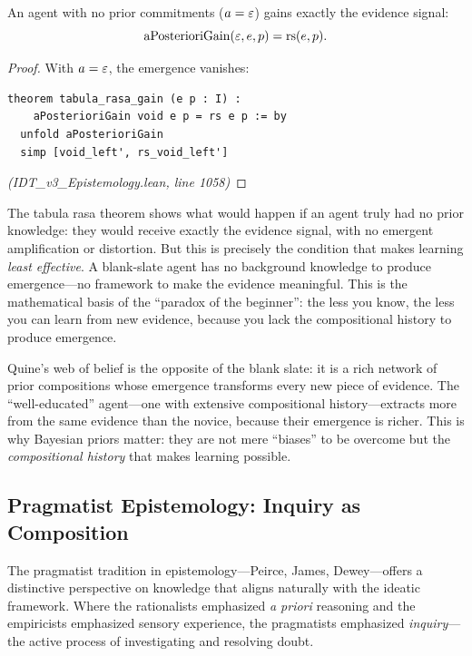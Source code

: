 \begin{theorem}
\label{thm:tabula-rasa}
An agent with no prior commitments ($a = \varepsilon$) gains exactly the evidence signal:
\[
  \mathrm{aPosterioriGain}(\varepsilon, e, p) = \mathrm{rs}(e, p).
\]
\end{theorem}

\begin{proof}
With $a = \varepsilon$, the emergence vanishes:
\begin{lstlisting}
theorem tabula_rasa_gain (e p : I) :
    aPosterioriGain void e p = rs e p := by
  unfold aPosterioriGain
  simp [void_left', rs_void_left']
\end{lstlisting}
\textit{(IDT\_v3\_Epistemology.lean, line 1058)}
\end{proof}

\begin{interpretation}
The tabula rasa theorem shows what would happen if an agent truly had no prior
knowledge: they would receive exactly the evidence signal, with no emergent
amplification or distortion. But this is precisely the condition that makes
learning \emph{least effective}. A blank-slate agent has no background knowledge
to produce emergence---no framework to make the evidence meaningful. This is the
mathematical basis of the ``paradox of the beginner'': the less you know, the
less you can learn from new evidence, because you lack the compositional history
to produce emergence.

Quine's web of belief is the opposite of the blank slate: it is a rich network
of prior compositions whose emergence transforms every new piece of evidence.
The ``well-educated'' agent---one with extensive compositional history---extracts
more from the same evidence than the novice, because their emergence is richer.
This is why Bayesian priors matter: they are not mere ``biases'' to be overcome
but the \emph{compositional history} that makes learning possible.
\end{interpretation}

\subsection{Pragmatist Epistemology: Inquiry as Composition}

The pragmatist tradition in epistemology---Peirce, James, Dewey---offers a distinctive
perspective on knowledge that aligns naturally with the ideatic framework. Where
the rationalists emphasized \emph{a priori} reasoning and the empiricists
emphasized sensory experience, the pragmatists emphasized \emph{inquiry}---the
active process of investigating and resolving doubt.

